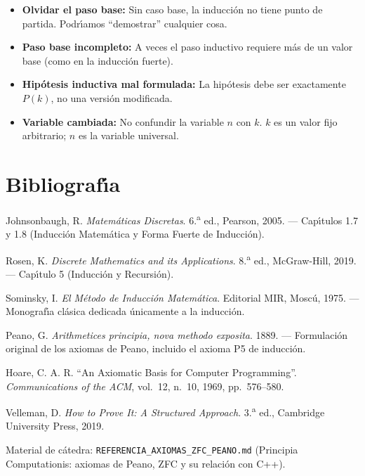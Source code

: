 \documentclass[11pt,a4paper]{article}
\theoremstyle{definition}
\theoremstyle{plain}
\theoremstyle{definition}
\theoremstyle{definition}
\theoremstyle{remark}
\begin{document}
\begin{itemize}
    \item \textbf{Olvidar el paso base:} Sin caso base, la inducci\'on no tiene
          punto de partida. Podr\'{\i}amos \enquote{demostrar} cualquier cosa.
    \item \textbf{Paso base incompleto:} A veces el paso inductivo requiere
          m\'as de un valor base (como en la inducci\'on fuerte).
    \item \textbf{Hip\'otesis inductiva mal formulada:} La hip\'otesis debe
          ser exactamente $P(k)$, no una versi\'on modificada.
    \item \textbf{Variable cambiada:} No confundir la variable $n$ con $k$.
          $k$ es un valor fijo arbitrario; $n$ es la variable universal.
\end{itemize}

\section{Bibliograf\'{\i}a}

\begin{enumerate}[label={[}\arabic{*}{]}]
    \item Johnsonbaugh, R. \textit{Matem\'aticas Discretas}. 6.\textsuperscript{a}
          ed., Pearson, 2005. — Cap\'{\i}tulos 1.7 y 1.8 (Inducci\'on Matem\'atica
          y Forma Fuerte de Inducci\'on).
    \item Rosen, K. \textit{Discrete Mathematics and its Applications}.
          8.\textsuperscript{a} ed., McGraw-Hill, 2019. — Cap\'{\i}tulo 5
          (Inducci\'on y Recursi\'on).
    \item Sominsky, I. \textit{El M\'etodo de Inducci\'on Matem\'atica}.
          Editorial MIR, Mosc\'u, 1975. — Monograf\'{\i}a cl\'asica dedicada
          \'unicamente a la inducci\'on.
    \item Peano, G. \textit{Arithmetices principia, nova methodo exposita}.
          1889. — Formulaci\'on original de los axiomas de Peano, incluido
          el axioma P5 de inducci\'on.
    \item Hoare, C. A. R. \enquote{An Axiomatic Basis for Computer Programming}.
          \textit{Communications of the ACM}, vol.\ 12, n.\ 10, 1969,
          pp.\ 576--580.
    \item Velleman, D. \textit{How to Prove It: A Structured Approach}.
          3.\textsuperscript{a} ed., Cambridge University Press, 2019.
    \item Material de c\'atedra: \texttt{REFERENCIA\_AXIOMAS\_ZFC\_PEANO.md}
          (Principia Computationis: axiomas de Peano, ZFC y su relaci\'on
          con C++).
\end{enumerate}
\end{document}
